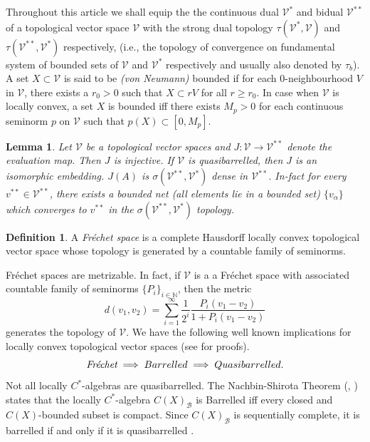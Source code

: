 \documentclass[10pt]{article}
\newtheorem{lemma}[theorem]{Lemma}
\theoremstyle{definition}
\newtheorem{definition}{Definition}[section]
\begin{document}
	Throughout this article we shall equip the the continuous dual $\mathcal V^{*}$ and bidual $\mathcal V^{**}$ of a topological vector space $\mathcal V$ with the strong dual topology $\tau (\mathcal V^*,\mathcal V)$ and $\tau(\mathcal V^{**},\mathcal V^*)$ respectively, (i.e., the topology of convergence on fundamental system of bounded sets of $\mathcal V$ and $\mathcal V^*$ respectively and usually also denoted by $\tau_b$). A set $X\subset \mathcal V$ is said to be \emph{(von Neumann)} bounded if for each $0$-neighbourhood $V$ in $\mathcal V$, there exists a $r_0>0$ such that $X\subset rV$ for all $r\geq r_0$. In case when $\mathcal V$ is locally convex, a set $X$ is bounded iff there exists $M_p>0$ for each continuous seminorm $p$ on $\mathcal V$ such that $p(X)\subset [0,M_p]$.
	\begin{lemma}
		Let $\mathcal V$ be a topological vector spaces and $J:\mathcal V\to \mathcal V^{**}$ denote the evaluation map. Then $J$ is injective. If $\mathcal V$ is quasibarrelled, then $J$ is an isomorphic embedding. $J(A)$ is $\sigma(\mathcal V^{**},\mathcal V^*)$ dense in $\mathcal V^{**}$. In-fact for every $v^{**}\in \mathcal V^{**}$, there exists a bounded net (all elements lie in a bounded set) $\{v_\alpha\}$ which converges to $v^{**}$ in the $\sigma(\mathcal V^{**},\mathcal V^*)$ topology. \cite[23.4.4]{Kothe}
	\end{lemma} 
	
	\begin{definition}
		A \emph{Fr\'echet space} is a complete Hausdorff locally convex topological vector space whose topology is generated by a countable family of seminorms.
	\end{definition}
	Fr\'echet spaces are metrizable. In fact, if $\mathcal V$ is a a Fr\'echet space with associated countable family of seminorms $\{P_i\}_{i\in \mathbb N}$, then the metric $$d(v_1,v_2)=\sum_{i=1}^\infty\frac{1}{2^i} \frac{P_i(v_1-v_2)}{1+P_i(v_1-v_2)}$$ generates the topology of $\mathcal V$.	We have the following well known implications for locally convex topological vector spaces (see \cite{Treves, Jarchow} for proofs).
	$$\emph{\text{Fr\'echet}}\implies Barrelled\implies Quasibarrelled.$$
	Not all locally $C^*$-algebras are quasibarrelled. The Nachbin-Shirota Theorem (\cite{Shirota}, \cite{Nachbin}) states that the locally $C^*$-algebra $C(X)_\mathcal B$ is Barrelled iff every closed and $C(X)$-bounded subset is compact. Since $C(X)_\mathcal B$ is sequentially complete, it is barrelled if and only if it is quasibarrelled \cite[27.2]{Kothe}.\\
	
\end{document}
